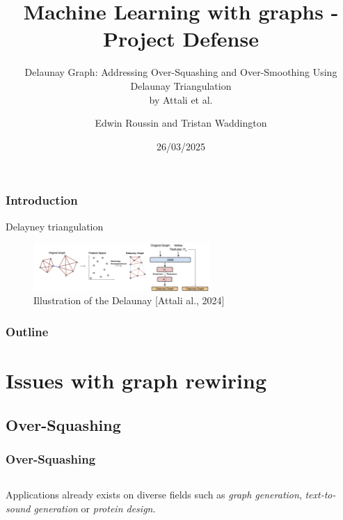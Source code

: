 \documentclass[10pt, aspectratio = 169]{beamer}
\title{Machine Learning with graphs - Project Defense}
\subtitle{Delaunay Graph: Addressing Over-Squashing and Over-Smoothing Using
Delaunay Triangulation\\
by Attali et al. \cite{attali2024delaunay}}
\author{Edwin Roussin and Tristan Waddington}
\institute{IP-Paris, CEMST}
\date{26/03/2025}
\begin{document}
\begin{frame}
    \titlepage
\end{frame}

\begin{frame}
    \frametitle{Introduction}
    \begin{block}{Delayney triangulation}
    
    \end{block}
    
    \begin{figure}
        \includegraphics[width=0.6\textwidth]{figures/Delaunay-Rewiring.png}
        \caption{Illustration of the Delaunay [Attali al., 2024] \cite{attali2024delaunay}}
    \end{figure}
\end{frame}


\begin{frame}
    \frametitle{Outline}
    \tableofcontents
\end{frame}

\section{Issues with graph rewiring}

\subsection{Over-Squashing}
\begin{frame}
    \frametitle{Over-Squashing}
    \begin{columns}
        \begin{column}{0.4\textwidth}
        
        \end{column}

        
        \begin{column}{0.4\textwidth}

        \end{column}
    \end{columns}

    Applications already exists on diverse fields such as \textit{graph generation}, 
    \textit{text-to-sound generation} or \textit{protein design}.

\end{frame}
\end{document}
